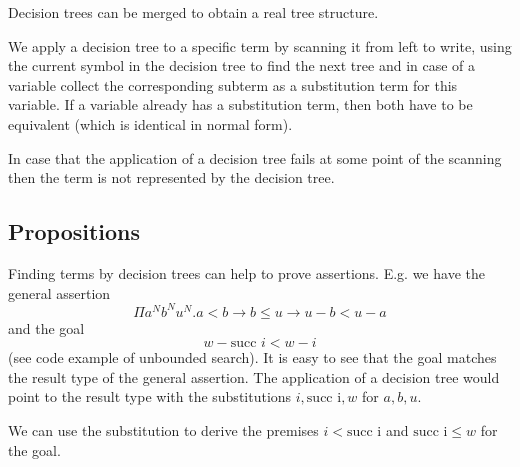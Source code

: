 Decision trees can be merged to obtain a real tree structure.

We apply a decision tree to a specific term by scanning it from left to write,
using the current symbol in the decision tree to find the next tree and in case
of a variable collect the corresponding subterm as a substitution term for this
variable. If a variable already has a substitution term, then both have to be
equivalent (which is identical in normal form).

In case that the application of a decision tree fails at some point of the
scanning then the term is not represented by the decision tree.


\subsection{Propositions}

Finding terms by decision trees can help to prove assertions. E.g. we have the
general assertion
$$
    \Pi a^N b^N u^N. a < b \to b \le u \to u - b < u - a
$$
and the goal
$$
    w - \text{succ } i < w - i
$$
(see code example of unbounded search). It is easy to see that the goal matches
the result type of the general assertion. The application of a decision tree
would point to the result type with the substitutions $i, \text{succ i}, w$ for
$a, b, u$.

We can use the substitution to derive the premises $i < \text{succ
i}$ and $\text{succ i} \le w$ for the goal.
